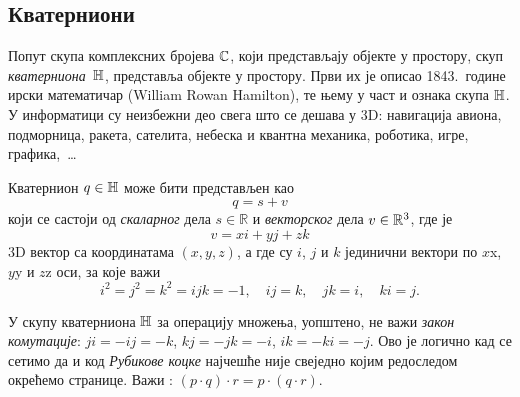 \subsection{Кватерниони}

\def\uv{{u}}
\def\vp{{v}}
\def\norm#1{{\vert#1\vert}}
\def\con#1{{\bar#1}}

Попут скупа комплексних бројева ${\mathbb C}$, који представљају објекте у  простору,
скуп {\sl кватерниона\/}~${\mathbb H}$, представља објекте у  простору. 
Први их је описао 1843.\ године ирски математичар
 (William Rowan Hamilton), те њему у част и ознака скупа
${\mathbb H}$.
У информатици су неизбежни део свега што се дешава у 3D:
навигација авиона, подморница, ракета, сателита,
небеска и квантна механика, роботика, игре, графика,~\dots

\medskip

Кватернион $q\in{\mathbb H}$ може бити представљен као 
\begin{equation}
    q=s+\vp
\end{equation}
који се састоји од {\sl скаларног\/} дела $s\in{\mathbb R}$ и {\sl векторског\/} дела 
$\vp\in\Rset^3$, где је
\begin{equation}
    \vp=xi+yj+zk
\end{equation}
3D вектор са координатама $(x,y,z)$, 
а где су $i$, $j$ и $k$ јединични вектори 
по $x$\idxaxis x, $y$\idxaxis y и $z$\idxaxis z оси, за које важи
\begin{equation}\label{eq:qunits}
    i^2=j^2=k^2=ijk=-1,\quad
    ij=k,\quad jk=i,\quad ki=j. 
\end{equation}

\danger 
У скупу кватерниона ${\mathbb H}$ за операцију множења, уопштено, не важи {\sl закон комутације}:
$ji=-ij=-k$, $kj=-jk=-i$, $ik=-ki=-j$.
Ово је логично кад се сетимо да и код
{\sl Рубикове коцке\/} 
најчешће није свеједно којим редоследом окрећемо странице.
Важи {\sl {}}: $(p\cdot q)\cdot r=p\cdot(q\cdot r)$.

\medskip

